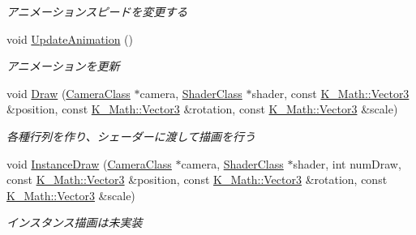 \begin{DoxyCompactItemize}
\begin{DoxyCompactList}\small\item\em アニメーションスピードを変更する \end{DoxyCompactList}\item 
void \mbox{\hyperlink{class_k___graphics_1_1_mesh_object_a0e4446fa8a0b979d488210bca87df41a}{Update\+Animation}} ()
\begin{DoxyCompactList}\small\item\em アニメーションを更新 \end{DoxyCompactList}\item 
void \mbox{\hyperlink{class_k___graphics_1_1_mesh_object_a86437d928a10a4ceaa0ccdb1ed174028}{Draw}} (\mbox{\hyperlink{class_k___graphics_1_1_camera_class}{Camera\+Class}} $\ast$camera, \mbox{\hyperlink{class_k___graphics_1_1_shader_class}{Shader\+Class}} $\ast$shader, const \mbox{\hyperlink{namespace_k___math_a66884d78082c39ada4091c211f3570f8}{K\+\_\+\+Math\+::\+Vector3}} \&position, const \mbox{\hyperlink{namespace_k___math_a66884d78082c39ada4091c211f3570f8}{K\+\_\+\+Math\+::\+Vector3}} \&rotation, const \mbox{\hyperlink{namespace_k___math_a66884d78082c39ada4091c211f3570f8}{K\+\_\+\+Math\+::\+Vector3}} \&scale)
\begin{DoxyCompactList}\small\item\em 各種行列を作り、シェーダーに渡して描画を行う \end{DoxyCompactList}\item 
void \mbox{\hyperlink{class_k___graphics_1_1_mesh_object_a049000c7a45b4119fa4523ad1705bb9a}{Instance\+Draw}} (\mbox{\hyperlink{class_k___graphics_1_1_camera_class}{Camera\+Class}} $\ast$camera, \mbox{\hyperlink{class_k___graphics_1_1_shader_class}{Shader\+Class}} $\ast$shader, int num\+Draw, const \mbox{\hyperlink{namespace_k___math_a66884d78082c39ada4091c211f3570f8}{K\+\_\+\+Math\+::\+Vector3}} \&position, const \mbox{\hyperlink{namespace_k___math_a66884d78082c39ada4091c211f3570f8}{K\+\_\+\+Math\+::\+Vector3}} \&rotation, const \mbox{\hyperlink{namespace_k___math_a66884d78082c39ada4091c211f3570f8}{K\+\_\+\+Math\+::\+Vector3}} \&scale)
\begin{DoxyCompactList}\small\item\em インスタンス描画は未実装 \end{DoxyCompactList}\end{DoxyCompactItemize}
